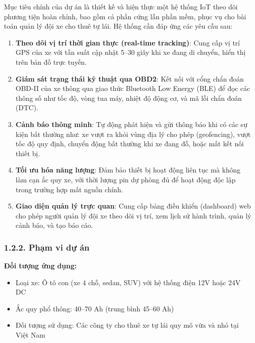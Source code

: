 \documentclass[13pt,a4paper]{extarticle}
\renewcommand{\\}{\thesislongtableorignewline\hline}%
\providecommand{\tightlist}{%
  \setlength{\itemsep}{0pt}\setlength{\parskip}{0pt}}
\begin{document}
Mục tiêu chính của dự án là thiết kế và hiện thực một hệ thống IoT theo
dõi phương tiện hoàn chỉnh, bao gồm cả phần cứng lẫn phần mềm, phục vụ
cho bài toán quản lý đội xe cho thuê tự lái. Hệ thống cần đáp ứng các
yêu cầu sau:

\begin{enumerate}
\def\labelenumi{\arabic{enumi}.}
\tightlist
\item
  \textbf{Theo dõi vị trí thời gian thực (real-time tracking)}: Cung cấp
  vị trí GPS của xe với tần suất cập nhật 5--30 giây khi xe đang di
  chuyển, hiển thị trên bản đồ trực tuyến.
\item
  \textbf{Giám sát trạng thái kỹ thuật qua OBD2}: Kết nối với cổng chẩn
  đoán OBD-II của xe thông qua giao thức Bluetooth Low Energy (BLE) để
  đọc các thông số như tốc độ, vòng tua máy, nhiệt độ động cơ, và mã lỗi
  chẩn đoán (DTC).
\item
  \textbf{Cảnh báo thông minh}: Tự động phát hiện và gửi thông báo khi
  có các sự kiện bất thường như: xe vượt ra khỏi vùng địa lý cho phép
  (geofencing), vượt tốc độ quy định, chuyển động bất thường khi xe đang
  đỗ, hoặc mất kết nối thiết bị.
\item
  \textbf{Tối ưu hóa năng lượng}: Đảm bảo thiết bị hoạt động liên tục mà
  không làm cạn ắc quy xe, với thời lượng pin dự phòng đủ để hoạt động
  độc lập trong trường hợp mất nguồn chính.
\item
  \textbf{Giao diện quản lý trực quan}: Cung cấp bảng điều khiển
  (dashboard) web cho phép người quản lý đội xe theo dõi vị trí, xem
  lịch sử hành trình, quản lý cảnh báo, và tạo báo cáo.
\end{enumerate}

\subsubsection{1.2.2. Phạm vi dự
án}\label{122-phux1ea1m-vi-dux1ef1-uxe1n}

\textbf{Đối tượng ứng dụng:}

\begin{itemize}
\tightlist
\item
  Loại xe: Ô tô con (xe 4 chỗ, sedan, SUV) với hệ thống điện 12V hoặc
  24V DC
\item
  Ắc quy phổ thông: 40--70 Ah (trung bình 45--60 Ah)
\item
  Đối tượng sử dụng: Các công ty cho thuê xe tự lái quy mô vừa và nhỏ
  tại Việt Nam
\end{itemize}
\end{document}
